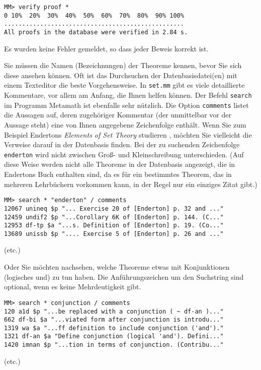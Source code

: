 \begin{verbatim}
MM> verify proof *
0 10%  20%  30%  40%  50%  60%  70%  80%  90% 100%
..................................................
All proofs in the database were verified in 2.84 s.
\end{verbatim}

Es wurden keine Fehler gemeldet, so dass jeder Beweis korrekt ist.

Sie müssen die Namen (Bezeichnungen) der Theoreme kennen, bevor Sie sich diese ansehen können. Oft ist das Durchsuchen der Datenbasisdatei(en) mit einem Texteditor die beste Vorgehensweise.  In \texttt{set.mm} gibt es viele detaillierte Kommentare, vor allem am Anfang, die Ihnen helfen können. Der Befehl \texttt{search} im Programm Metamath ist ebenfalls sehr nützlich.  Die Option \texttt{comments} listet die Aussagen auf, deren zugehöriger Kommentar (der unmittelbar vor der Aussage steht) eine von Ihnen angegebene Zeichenfolge enthält.  Wenn Sie zum Beispiel Endertons {\em Elements of Set Theory} studieren \cite{Enderton}, möchten Sie vielleicht die Verweise darauf in der Datenbasis finden.  Bei der zu suchenden Zeichenfolge \texttt{enderton} wird nicht zwischen Groß- und Kleinschreibung unterschieden.  (Auf diese Weise werden nicht alle Theoreme in der Datenbasis angezeigt, die in Endertons Buch enthalten sind, da es für ein bestimmtes Theorem, das in mehreren Lehrbüchern vorkommen kann, in der Regel nur ein einziges Zitat gibt.)

\begin{verbatim}
MM> search * "enderton" / comments
12067 unineq $p "... Exercise 20 of [Enderton] p. 32 and ..."
12459 undif2 $p "...Corollary 6K of [Enderton] p. 144. (C..."
12953 df-tp $a "...s. Definition of [Enderton] p. 19. (Co..."
13689 unissb $p ".... Exercise 5 of [Enderton] p. 26 and ..."
\end{verbatim}
\begin{center}
(etc.)
\end{center}

Oder Sie möchten nachsehen, welche Theoreme etwas mit Konjunktionen (logisches {\sc und}) zu tun haben.  Die Anführungszeichen um den Suchstring sind optional, wenn es keine Mehrdeutigkeit gibt.

\begin{verbatim}
MM> search * conjunction / comments
120 a1d $p "...be replaced with a conjunction ( ~ df-an )..."
662 df-bi $a "...viated form after conjunction is introdu..."
1319 wa $a "...ff definition to include conjunction ('and')."
1321 df-an $a "Define conjunction (logical 'and'). Defini..."
1420 imnan $p "...tion in terms of conjunction. (Contribu..."
\end{verbatim}
\begin{center}
(etc.)
\end{center}

